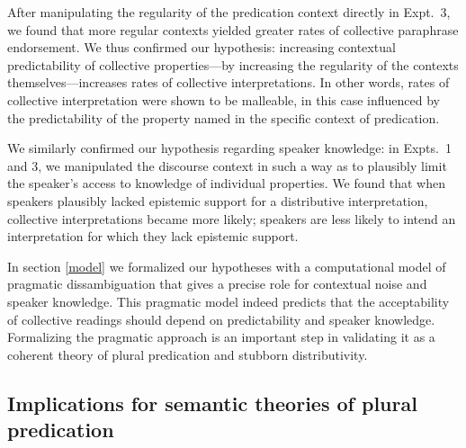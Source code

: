 \documentclass[linguex]{sp}
\newcommand{\ndg}[1]{\textcolor{Green}{[ndg: #1]}}
\begin{document}
After manipulating the regularity of the predication context directly in Expt.~3, we found that more regular contexts yielded greater rates of collective paraphrase endorsement. We thus confirmed our hypothesis: increasing contextual predictability of collective properties---by increasing the regularity of the contexts themselves---increases rates of collective interpretations. In other words, rates of collective interpretation were shown to be malleable, in this case influenced by the predictability of the property named in the specific context of predication. 

We similarly confirmed our hypothesis regarding speaker knowledge: in Expts.~1 and 3, we manipulated the discourse context in such a way as to plausibly limit the speaker's access to knowledge of individual properties. We found that when speakers plausibly lacked epistemic support for a distributive interpretation, collective interpretations became more likely; speakers are less likely to intend an interpretation for which they lack epistemic support.

In section \ref{model} we formalized our hypotheses with a computational model of pragmatic dissambiguation that gives a precise role for contextual noise and speaker knowledge. This pragmatic model indeed predicts that the acceptability of collective readings should depend on predictability and speaker knowledge. Formalizing the pragmatic approach is an important step in validating it as a coherent theory of plural predication and  stubborn distributivity.


\subsection{Implications for semantic theories of plural predication}


\end{document}
